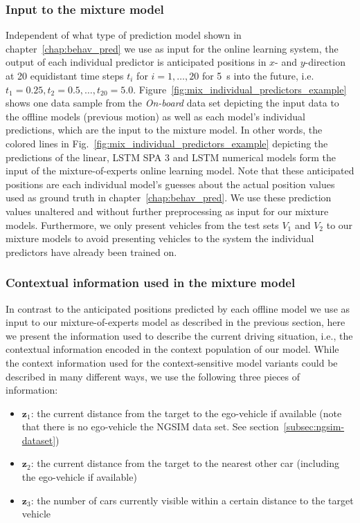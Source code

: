 \subsubsection{Input to the mixture model}%
\label{ssubsec:input_to_the_mixture_model}


Independent of what type of prediction model shown in chapter~\ref{chap:behav_pred} we use as input for the online learning system, the output of each individual predictor is anticipated positions in $x$- and $y$-direction at \num{20} equidistant time steps $t_i$ for $i=1,\ldots,20$ for \SI{5}{\second} into the future, i.e.\ $t_1=0.25, t_2=0.5, \ldots, t_{20}=5.0$.
Figure~\ref{fig:mix_individual_predictors_example} shows one data sample from the \emph{On-board} data set depicting the input data to the offline models (previous motion) as well as each model's individual predictions, which are the input to the mixture model. 
In other words, the colored lines in Fig.~\ref{fig:mix_individual_predictors_example} depicting the predictions of the linear, \acs{LSTM} \acs{SPA} \num{3} and \acs{LSTM} numerical models form the input of the mixture-of-experts online learning model.
Note that these anticipated positions are each individual model's guesses about the actual position values used as ground truth in chapter~\ref{chap:behav_pred}.
We use these prediction values unaltered and without further preprocessing as input for our mixture models.
Furthermore, we only present vehicles from the test sets $V_1$ and $V_2$ to our mixture models to avoid presenting vehicles to the system the individual predictors have already been trained on.

\subsubsection{Contextual information used in the mixture model}%
\label{ssubsec:contextual_information_used_in_the_mixture_model}

In contrast to the anticipated positions predicted by each offline model we use as input to our mixture-of-experts model as described in the previous section, here we present the information used to describe the current driving situation, i.e., the contextual information encoded in the context population of our model.
While the context information used for the context-sensitive model variants could be described in many different ways, we use the following three pieces of information:

\begin{itemize}
    \item{$\mathbf{z}_1$: the current distance from the target to the ego-vehicle if available (note that there is no ego-vehicle the \ac{NGSIM} data set. See section~\ref{subsec:ngsim-dataset})}
\item{$\mathbf{z}_2$: the current distance from the target to the nearest other car (including
    the ego-vehicle if available)}
\item{$\mathbf{z}_3$: the number of cars currently visible within a certain distance to the target vehicle}
\end{itemize}

